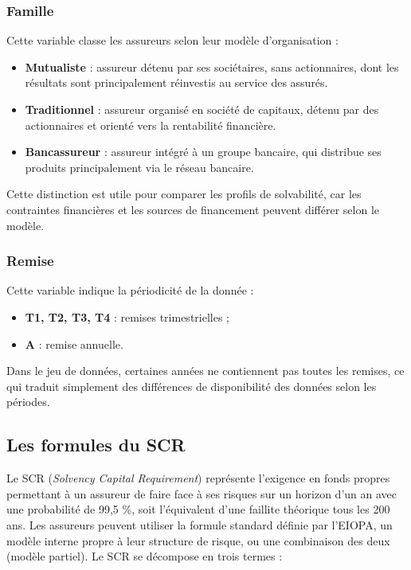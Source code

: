 \documentclass[
]{article}
\providecommand{\tightlist}{%
  \setlength{\itemsep}{0pt}\setlength{\parskip}{0pt}}
\begin{document}
\subsubsection{Famille}\label{famille}

Cette variable classe les assureurs selon leur modèle d'organisation :

\begin{itemize}
\tightlist
\item
  \textbf{Mutualiste} : assureur détenu par ses sociétaires, sans
  actionnaires, dont les résultats sont principalement réinvestis au
  service des assurés.
\item
  \textbf{Traditionnel} : assureur organisé en société de capitaux,
  détenu par des actionnaires et orienté vers la rentabilité financière.
\item
  \textbf{Bancassureur} : assureur intégré à un groupe bancaire, qui
  distribue ses produits principalement via le réseau bancaire.
\end{itemize}

Cette distinction est utile pour comparer les profils de solvabilité,
car les contraintes financières et les sources de financement peuvent
différer selon le modèle.

\subsubsection{Remise}\label{remise}

Cette variable indique la périodicité de la donnée :

\begin{itemize}
\tightlist
\item
  \textbf{T1, T2, T3, T4} : remises trimestrielles ;
\item
  \textbf{A} : remise annuelle.
\end{itemize}

Dans le jeu de données, certaines années ne contiennent pas toutes les
remises, ce qui traduit simplement des différences de disponibilité des
données selon les périodes.

\subsection{Les formules du SCR}\label{les-formules-du-scr}

Le SCR (\emph{Solvency Capital Requirement}) représente l'exigence en
fonds propres permettant à un assureur de faire face à ses risques sur
un horizon d'un an avec une probabilité de 99,5 \%, soit l'équivalent
d'une faillite théorique tous les 200 ans. Les assureurs peuvent
utiliser la formule standard définie par l'EIOPA, un modèle interne
propre à leur structure de risque, ou une combinaison des deux (modèle
partiel). Le SCR se décompose en trois termes :
\end{document}
